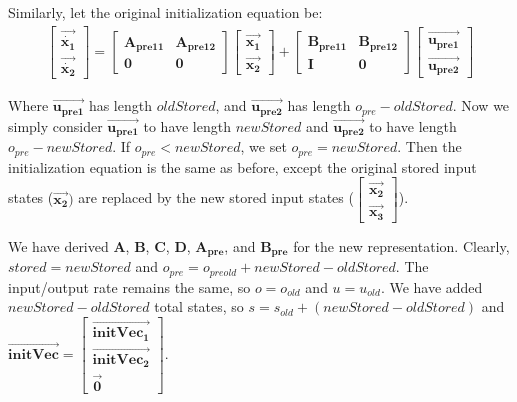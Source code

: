     Similarly, let the original initialization equation be:
\begin{eqnarray*}
\left [ \begin{array} {c} \vec{\dot{\mathbf{x_1}}} \\
\vec{\dot{\mathbf{x_2}}} \end{array} \right ] = \left [
\begin{array} {cc} \mathbf{A_{pre11}} & \mathbf{A_{pre12}} \\
\mathbf{0} & \mathbf{0} \end{array} \right ] \left [
\begin{array} {c} \vec{\mathbf{x_1}} \\ \vec{\mathbf{x_2}}
\end{array} \right ] + \left [ \begin{array} {cc} \mathbf{B_{pre11}} & \mathbf{B_{pre12}} \\
\mathbf{I} & \mathbf{0} \end{array} \right ] \left [ \begin{array}
{c} \vec{\mathbf{u_{pre1}}} \\ \vec{\mathbf{u_{pre2}}}
\end{array} \right ]
\end{eqnarray*}

    Where $\vec{\mathbf{u_{pre1}}}$ has length $oldStored$, and
$\vec{\mathbf{u_{pre2}}}$ has length $o_{pre} - oldStored$. Now we
simply consider $\vec{\mathbf{u_{pre1}}}$ to have length
$newStored$ and $\vec{\mathbf{u_{pre2}}}$ to have length $o_{pre}
- newStored$. If $o_{pre} < newStored$, we set $o_{pre} =
newStored$. Then the initialization equation is the same as
before, except the original stored input states
($\vec{\mathbf{x_2}})$ are replaced by the new stored input states
($\left [ \begin{array} {c} \vec{\mathbf{x_2}} \\
\vec{\mathbf{x_3}} \end{array} \right ]$).

    We have derived $\mathbf{A}$, $\mathbf{B}$, $\mathbf{C}$, $\mathbf{D}$,
$\mathbf{A_{pre}}$, and $\mathbf{B_{pre}}$ for the new
representation. Clearly, $stored = newStored$ and $o_{pre} =
o_{preold} + newStored-oldStored$. The input/output rate remains
the same, so $o = o_{old}$ and $u = u_{old}$. We have added
$newStored-oldStored$ total states, so $s = s_{old} + (newStored -
oldStored)$ and $\overrightarrow{\mathbf{initVec}} =
\left [ \begin{array} {c} \overrightarrow{\mathbf{initVec_1}} \\
\overrightarrow{\mathbf{initVec_2}} \\ \overrightarrow{\mathbf{0}}
\end{array} \right ]$.

